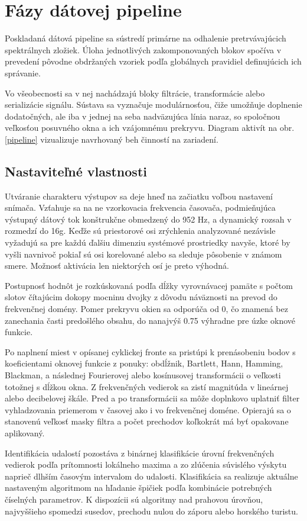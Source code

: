 \section{Fázy dátovej pipeline}
Poskladaná dátová pipeline sa sústredí primárne na odhalenie pretrvávajúcich spektrálnych zložiek. Úloha jednotlivých 
zakomponovaných blokov spočíva v prevedení pôvodne obdržaných vzoriek podľa globálnych pravidiel definujúcich ich správanie. 

Vo všeobecnosti sa v nej nachádzajú bloky filtrácie, transformácie alebo serializácie signálu. Sústava sa 
vyznačuje modulárnosťou, čiže umožňuje doplnenie dodatočných, ale iba v jednej na seba nadväzujúca
línia naraz, so spoločnou veľkosťou posuvného okna a ich vzájomnému prekryvu. Diagram aktivít na obr. \ref{pipeline}
vizualizuje navrhovaný beh činností na zariadení.

\subsection{Nastaviteľné vlastnosti}
Utváranie charakteru výstupov sa deje hneď na začiatku voľbou nastavení snímača.
Vzťahuje sa na ne vzorkovacia frekvencia časovača, podmieňujúca výstupný dátový tok konštrukčne obmedzený do 952 Hz, 
a dynamický rozsah v rozmedzí do 16g. Keďže sú priestorové osi zrýchlenia analyzované nezávisle vyžadujú sa pre každú ďalšiu
dimenziu systémové prostriedky navyše, ktoré by vyšli navnivoč pokiaľ sú osi korelované alebo sa sleduje pôsobenie v 
známom smere. Možnosť aktivácia len niektorých osí je preto výhodná.

Postupnosť hodnôt je rozkúskovaná podľa dĺžky vyrovnávacej pamäte s počtom slotov čítajúcim dokopy mocninu dvojky
z dôvodu náväznosti na prevod do frekvenčnej domény. Pomer prekryvu okien sa odporúča od 0, čo znamená bez zanechania časti predošlého 
obsahu, do nanajvýš 0.75 výhradne pre úzke oknové funkcie.

Po naplnení miest v opísanej cyklickej fronte sa pristúpi k prenásobeniu bodov s koeficientami oknovej funkcie 
z ponuky: obdĺžnik, Bartlett, Hann, Hamming, Blackman, a následnej Fourierovej alebo kosínusovej transformácii o veľkosti totožnej s dĺžkou 
okna. Z frekvenčných vedierok sa zistí magnitúda v lineárnej alebo decibelovej škále. 
Pred a po transformácii sa môže doplnkovo uplatniť filter vyhladzovania priemerom v časovej ako i vo frekvenčnej doméne.
Opierajú sa o stanovenú veľkosť masky filtra a počet prechodov koľkokrát má byť opakovane aplikovaný.

Identifikácia udalostí pozostáva z binárnej klasifikácie úrovní frekvenčných vedierok podľa prítomnosti lokálneho maxima a
zo zlúčenia súvislého výskytu naprieč dlhším časovým intervalom do udalosti. Klasifikácia sa realizuje 
aktuálne nastaveným algoritmom na hľadanie špičiek podľa kombinácie potrebných číselných parametrov. K dispozícii sú
algoritmy nad prahovou úrovňou, najvyššieho spomedzi susedov, prechodu nulou do záporu alebo horského turistu.


